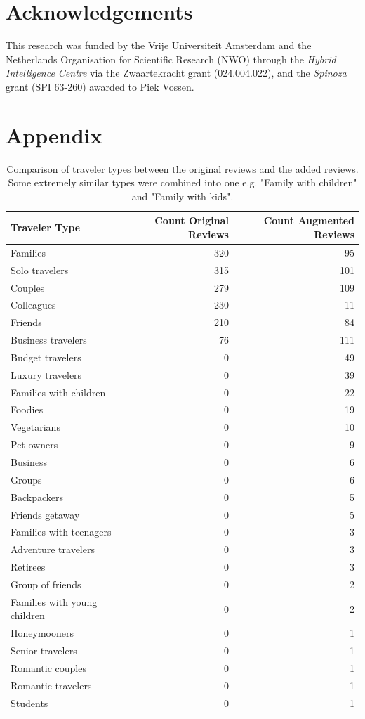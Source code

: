 \documentclass[11pt]{article}
\begin{document}
\section*{Acknowledgements}
This research was funded by the Vrije Universiteit Amsterdam and the Netherlands Organisation for Scientific Research (NWO) through the \textit{Hybrid Intelligence Centre} via the Zwaartekracht grant (024.004.022), and the \textit{Spinoza} grant (SPI 63-260) awarded to Piek Vossen.




\onecolumn
\appendix

\section{Appendix}
\label{sec:appendix}



\begin{table}[ht]
\centering
\begin{tabular}{@{}lrr@{}}
\toprule
\textbf{Traveler Type} & \textbf{Count Original Reviews} & \textbf{Count Augmented Reviews} \\
\midrule
Families & 320 & 95 \\
Solo travelers & 315 & 101 \\
Couples & 279 & 109 \\
Colleagues & 230 & 11 \\
Friends & 210 & 84 \\
Business travelers & 76 & 111 \\
Budget travelers & 0 & 49 \\
Luxury travelers & 0 & 39 \\
Families with children & 0 & 22 \\
Foodies & 0 & 19 \\
Vegetarians & 0 & 10 \\
Pet owners & 0 & 9 \\
Business & 0 & 6 \\
Groups & 0 & 6 \\
Backpackers & 0 & 5 \\
Friends getaway & 0 & 5 \\
Families with teenagers & 0 & 3 \\
Adventure travelers & 0 & 3 \\
Retirees & 0 & 3 \\
Group of friends & 0 & 2 \\
Families with young children & 0 & 2 \\
Honeymooners & 0 & 1 \\
Senior travelers & 0 & 1 \\
Romantic couples & 0 & 1 \\
Romantic travelers & 0 & 1 \\
Students & 0 & 1 \\
\bottomrule
\end{tabular}
\caption{Comparison of traveler types between the original reviews and the added reviews. Some extremely similar types were combined into one e.g. "Family with children" and "Family with kids".}
\label{tab:traveler_types}
\end{table}
\end{document}
